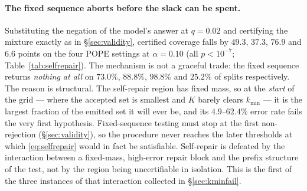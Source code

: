 \documentclass[review,number,doubleblind]{elsarticle}
\theoremstyle{plain}
\theoremstyle{definition}
\theoremstyle{remark}
\begin{document}
\paragraph{The fixed sequence aborts before the slack can be spent.}
Substituting the negation of the model's answer at $q=0.02$ and certifying the mixture exactly
as in \S\ref{sec:validity}, certified coverage falls by $49.3$, $37.3$, $76.9$ and $6.6$ points
on the four POPE settings at $\alpha=0.10$ (all $p<10^{-7}$; Table~\ref{tab:selfrepair}). The
mechanism is not a graceful trade: the fixed sequence returns \emph{nothing at all} on
$73.0\%$, $88.8\%$, $98.8\%$ and $25.2\%$ of splits respectively. The reason is structural. The
self-repair region has fixed mass, so at the \emph{start} of the grid --- where the accepted set
is smallest and $K$ barely clears $k_{\min}$ --- it is the largest fraction of the emitted set
it will ever be, and its $4.9$--$62.4\%$ error rate fails the very first hypothesis.
Fixed-sequence testing must stop at the first non-rejection (\S\ref{sec:validity}), so the
procedure never reaches the later thresholds at which \eqref{eq:selfrepair} would in fact be
satisfiable. Self-repair is defeated by the interaction between a fixed-mass, high-error repair
block and the prefix structure of the test, not by the region being uncertifiable in isolation.
This is the first of the three instances of that interaction collected in
\S\ref{sec:kminfail}.
\end{document}

